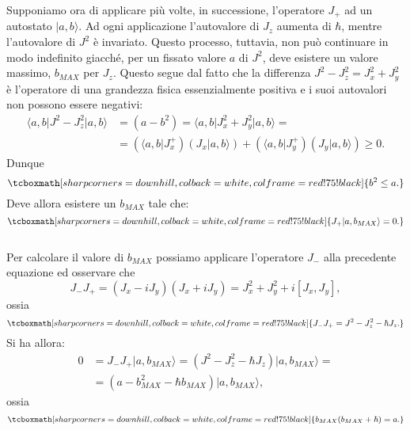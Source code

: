 Supponiamo ora di applicare più volte, in successione, l'operatore $J_+$ ad un autostato $\vert a,b \rangle $. Ad ogni applicazione l'autovalore di $J_z$ aumenta di $\hbar$, mentre l'autovalore di $J^2$ è invariato. Questo processo, tuttavia, non può continuare in modo indefinito giacché, per un fissato valore $a$ di $J^2$, deve esistere un valore massimo, $b_{MAX}$ per $J_z$. Questo segue dal fatto che la differenza $J^2-J_z ^2=J_x ^2+J_y ^2$ è l'operatore di una grandezza fisica essenzialmente positiva e i suoi autovalori non possono essere negativi:
	\begin{align}
		\langle a,b \vert J^2-J_z ^2 \vert a, b \rangle &= (a-b^2) =  \langle a,b \vert J_x ^2+J_y ^2 \vert a, b \rangle = \nonumber \\
		&=\left(\langle a,b \vert J_x ^+\right) \left(J_x \vert a, b \rangle\right)+\left(\langle a,b \vert J_y ^+\right) \left(J_y \vert a, b \rangle\right) \geq 0.
	\end{align}
Dunque
	\begin{equation}
		\tcboxmath[sharp corners=downhill, colback=white, colframe=red!75!black]{
			b^2 \leq a .
			}
	\label{eq:cap16_6}
	\end{equation}
Deve allora esistere un $b_{MAX}$ tale che:
	\begin{equation}
		\tcboxmath[sharp corners=downhill, colback=white, colframe=red!75!black]{
			J_{+} \vert a, b_{MAX} \rangle =0.
			}
	\end{equation}\\
	
Per calcolare il valore di $b_{MAX}$ possiamo applicare l'operatore $J_-$ alla precedente equazione ed osservare che 
	\begin{equation}
		J_-J_+ = (J_x-iJ_y)(J_x+iJ_y)= J_x^2 +J_y ^2+i[J_x, J_y] ,
	\end{equation}
ossia 
	\begin{equation}
		\tcboxmath[sharp corners=downhill, colback=white, colframe=red!75!black]{
			J_-J_+ = J^2 -J_z ^2 -\hbar J_z .
			}
	\label{eq:cap16_7}
	\end{equation}
Si ha allora:
	\begin{align}
		0&=J_{-}J_{+} \vert a, b_{MAX} \rangle = (J^2 -J_z ^2 -\hbar J_z)\vert a, b_{MAX} \rangle = \nonumber \\
		&=(a- b_{MAX} ^2 - \hbar b_{MAX} )\vert a, b_{MAX} \rangle,
	\end{align}
ossia
	\begin{equation}
		\tcboxmath[sharp corners=downhill, colback=white, colframe=red!75!black]{
			b_{MAX}(b_{MAX}+\hbar) =a .
			}
	\label{eq:cap16_8}
	\end{equation}\\
	
